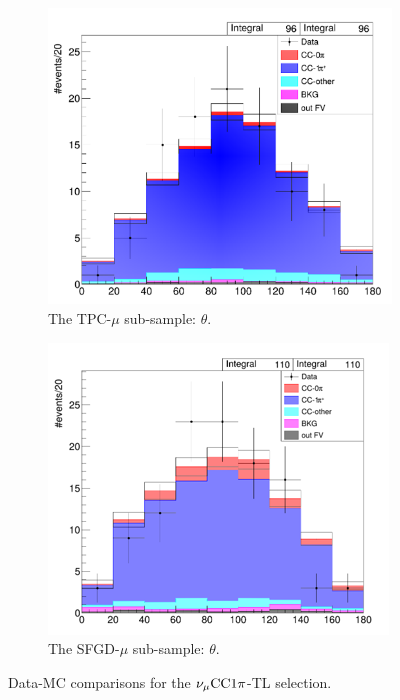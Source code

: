 \begin{figure}[h]
\begin{subfigure}{\dbfigwid\textwidth}
                    \label{subfig:datamc-sfgmu}
               \end{subfigure}
               \\
               \begin{subfigure}{\dbfigwid\textwidth}
                    \includegraphics[width=\textwidth]{figures/sel/datamc-comp-tpi-tpcmu.png}
                    \caption{The TPC-$\mu$ sub-sample: $\theta$.}
                    \label{subfig:datamc-theta-tpcmu}
               \end{subfigure}
               \begin{subfigure}{\dbfigwid\textwidth}
                    \includegraphics[width=\textwidth]{figures/sel/datamc-comp-tpi-sfgmu.png}
                    \caption{The SFGD-$\mu$ sub-sample: $\theta$.}
                    \label{subfig:datamc-theta-sfgmu}
               \end{subfigure}
               \caption{Data-MC comparisons for the $\nu_{\mu}\textrm{CC}1\pi$-TL selection.}
               \label{fig:tlpi-datamc}
          \end{figure}

